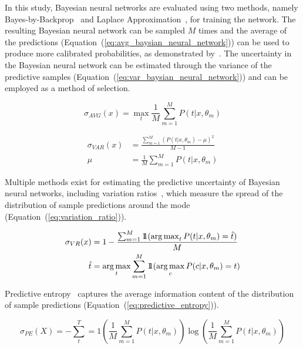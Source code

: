 In this study, Bayesian neural networks are evaluated using two methods, namely Bayes-by-Backprop~\citep{blundell2015weight} and Laplace Approximation~\citep{mackay1992bayesian}, for training the network. The resulting Bayesian neural network can be sampled $M$ times and the average of the predictions (Equation~(\ref{eq:avg_baysian_neural_network})) can be used to produce more calibrated probabilities, as demonstrated by~\citep{jospin2020hands}. The uncertainty in the Bayesian neural network can be estimated through the variance of the predictive samples (Equation~(\ref{eq:var_baysian_neural_network})) and can be employed as a method of selection.

\begin{equation}
	\sigma_{AVG}(x)=\max_t\frac{1}{M}\sum^M_{m=1}P(t|x,\theta_m)
	\label{eq:avg_baysian_neural_network}
\end{equation}

\begin{equation}
	\begin{aligned}
		\sigma_{VAR}(x)&=\frac{\sum^M_{m=1}(P(t|x,\theta_m)-\mu)^2}{M-1}\\
		\mu&=\frac{1}{M}\sum^M_{m=1}P(t|x,\theta_m)
	\end{aligned}
	\label{eq:var_baysian_neural_network}
\end{equation}

Multiple methods exist for estimating the predictive uncertainty of Bayesian neural networks, including variation ratios~\citep{freeman1965elementary}, which measure the spread of the distribution of sample predictions around the mode (Equation~(\ref{eq:variation_ratio})).

\begin{equation}
	\begin{aligned}
		\sigma_{VR}(x) &= 1 - \frac{\sum^M_{m=1}1\!\!1(\operatorname*{arg\,max}_tP(t|x,\theta_m)=\hat{t})}{M}\\
		\qquad\hat{t} &= \operatorname*{arg\,max}_t\sum^M_{m=1}1\!\!1(\operatorname*{arg\,max}_cP(c|x,\theta_m)=t)
	\end{aligned}
	\label{eq:variation_ratio}
\end{equation}

\noindent Predictive entropy~\citep{shannon1948mathematical} captures the average information content of the distribution of sample predictions (Equation~(\ref{eq:predictive_entropy})).
   
\begin{equation}
	\sigma_{PE}(X)=-\sum^T_t=1\left(\frac{1}{M}\sum^M_{m=1}P(t|x,\theta_m)\right)\log\left(\frac{1}{M}\sum^M_{m=1}P(t|x,\theta_m)\right)
	\label{eq:predictive_entropy}
\end{equation}

